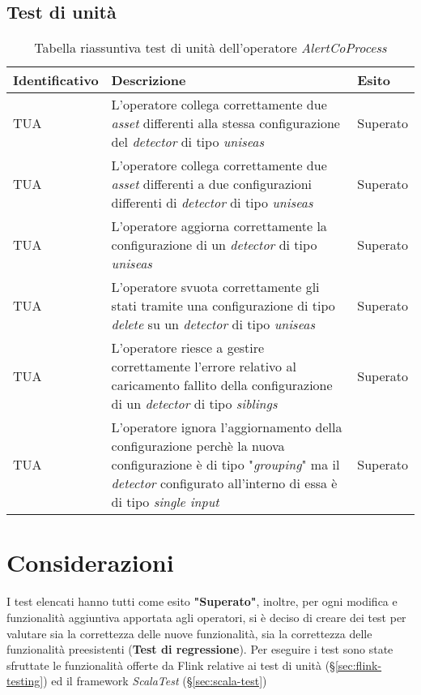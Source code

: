 \subsection{Test di unità}
{
\centering
\begin{longtable}{L{3cm} L{8.5cm} L{2cm}}
\caption{Tabella riassuntiva test di unità dell'operatore \textit{AlertCoProcess}}\\
\textbf{Identificativo} &
\textbf{Descrizione}&
\textbf{Esito}\\
\endhead
\hline

TUA & L'operatore collega correttamente due \textit{asset} differenti alla stessa configurazione del \textit{detector} di tipo \textit{uniseas} & Superato\\
\hline
TUA & L'operatore collega correttamente due \textit{asset} differenti a due configurazioni differenti di \textit{detector} di tipo \textit{uniseas} & Superato \\
\hline
TUA &  L'operatore aggiorna correttamente la configurazione di un \textit{detector} di tipo \textit{uniseas} & Superato\\
\hline
TUA & L'operatore svuota correttamente gli stati tramite una configurazione di tipo \textit{delete} su un \textit{detector} di tipo \textit{uniseas} & Superato \\
\hline
TUA & L'operatore riesce a gestire correttamente l'errore relativo al caricamento fallito della configurazione di un \textit{detector} di tipo \textit{siblings} & Superato\\
\hline
TUA & L'operatore ignora l'aggiornamento della configurazione perchè la nuova configurazione è di tipo "\textit{grouping}" ma il \textit{detector} configurato all'interno di essa è di tipo \textit{single input} & Superato \\
\hline
\end{longtable}
}

\section{Considerazioni}
I test elencati hanno tutti come esito \textbf{"Superato"}, inoltre, per ogni modifica e funzionalità aggiuntiva apportata agli operatori, si è deciso di creare dei test per valutare sia la correttezza delle nuove funzionalità, sia la correttezza delle funzionalità preesistenti (\textbf{Test di regressione}). Per eseguire i test sono state sfruttate le funzionalità offerte da Flink relative ai test di unità (\S\ref{sec:flink-testing}) ed il \gls{framework} \textit{ScalaTest} (\S\ref{sec:scala-test})